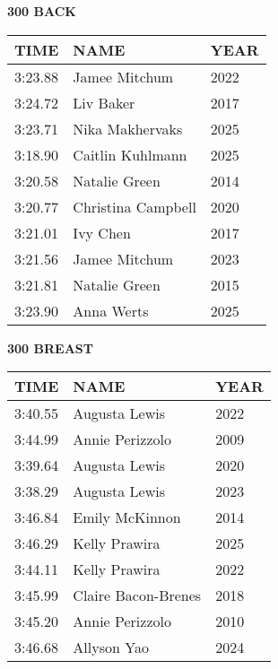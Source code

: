 \begin{minipage}[t]{0.48\textwidth}
\centering
\textbf{300 BACK}\\[0.05cm]
\begin{tabular}{@{}p{1.8cm}p{2.8cm}p{1.2cm}@{}}
\hline
\textbf{TIME} & \textbf{NAME} & \textbf{YEAR} \\
\hline
3:23.88 & Jamee Mitchum & 2022 \\
3:24.72 & Liv Baker & 2017 \\
3:23.71 & Nika Makhervaks & 2025 \\
3:18.90 & Caitlin Kuhlmann & 2025 \\
3:20.58 & Natalie Green & 2014 \\
3:20.77 & Christina Campbell & 2020 \\
3:21.01 & Ivy Chen & 2017 \\
3:21.56 & Jamee Mitchum & 2023 \\
3:21.81 & Natalie Green & 2015 \\
3:23.90 & Anna Werts & 2025 \\
\hline
\end{tabular}
\end{minipage}\hfill
\begin{minipage}[t]{0.48\textwidth}
\centering
\textbf{300 BREAST}\\[0.05cm]
\begin{tabular}{@{}p{1.8cm}p{2.8cm}p{1.2cm}@{}}
\hline
\textbf{TIME} & \textbf{NAME} & \textbf{YEAR} \\
\hline
3:40.55 & Augusta Lewis & 2022 \\
3:44.99 & Annie Perizzolo & 2009 \\
3:39.64 & Augusta Lewis & 2020 \\
3:38.29 & Augusta Lewis & 2023 \\
3:46.84 & Emily McKinnon & 2014 \\
3:46.29 & Kelly Prawira & 2025 \\
3:44.11 & Kelly Prawira & 2022 \\
3:45.99 & Claire Bacon-Brenes & 2018 \\
3:45.20 & Annie Perizzolo & 2010 \\
3:46.68 & Allyson Yao & 2024 \\
\hline
\end{tabular}
\end{minipage}

\vspace{0.4cm}

